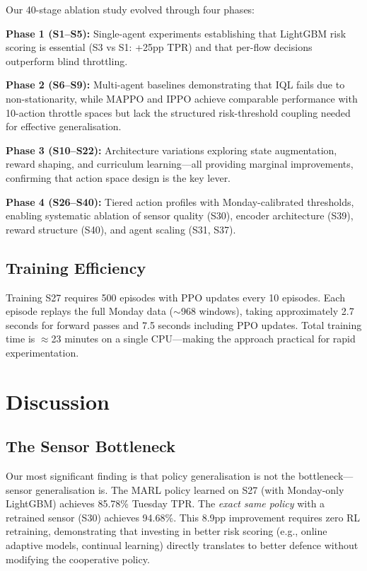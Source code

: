 \documentclass[sigconf,nonacm]{acmart}
\begin{document}
Our 40-stage ablation study evolved through four phases:

\textbf{Phase 1 (S1--S5):} Single-agent experiments establishing that LightGBM risk scoring is essential (S3 vs S1: +25pp TPR) and that per-flow decisions outperform blind throttling.

\textbf{Phase 2 (S6--S9):} Multi-agent baselines demonstrating that IQL fails due to non-stationarity, while MAPPO and IPPO achieve comparable performance with 10-action throttle spaces but lack the structured risk-threshold coupling needed for effective generalisation.

\textbf{Phase 3 (S10--S22):} Architecture variations exploring state augmentation, reward shaping, and curriculum learning---all providing marginal improvements, confirming that action space design is the key lever.

\textbf{Phase 4 (S26--S40):} Tiered action profiles with Monday-calibrated thresholds, enabling systematic ablation of sensor quality (S30), encoder architecture (S39), reward structure (S40), and agent scaling (S31, S37).

\subsection{Training Efficiency}

Training S27 requires 500 episodes with PPO updates every 10 episodes. Each episode replays the full Monday data ($\sim$968 windows), taking approximately 2.7 seconds for forward passes and 7.5 seconds including PPO updates. Total training time is $\approx$23 minutes on a single CPU---making the approach practical for rapid experimentation.


\section{Discussion}
\label{sec:discussion}



\subsection{The Sensor Bottleneck}

Our most significant finding is that policy generalisation is not the bottleneck---sensor generalisation is. The MARL policy learned on S27 (with Monday-only LightGBM) achieves 85.78\% Tuesday TPR. The \emph{exact same policy} with a retrained sensor (S30) achieves 94.68\%. This 8.9pp improvement requires zero RL retraining, demonstrating that investing in better risk scoring (e.g., online adaptive models, continual learning) directly translates to better defence without modifying the cooperative policy.
\end{document}
